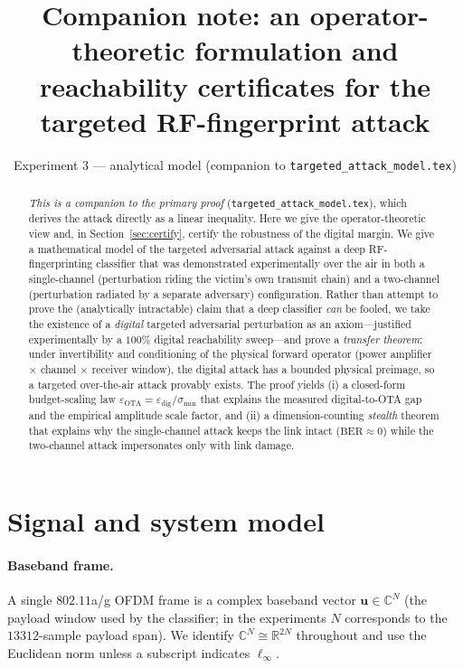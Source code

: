 \documentclass[11pt]{article}
\title{Companion note: an operator-theoretic formulation and \\
       reachability certificates for the targeted RF-fingerprint attack}
\author{Experiment 3 --- analytical model (companion to \texttt{targeted\_attack\_model.tex})}
\date{}
\theoremstyle{definition}
\newcommand{\C}{\mathbb{C}}
\newcommand{\R}{\mathbb{R}}
\newcommand{\bu}{\bm{u}}
\newcommand{\smin}{\sigma_{\min}}
\begin{document}
\maketitle

\begin{abstract}
\emph{This is a companion to the primary proof} (\texttt{targeted\_attack\_model.tex}), which
derives the attack directly as a linear inequality. Here we give the operator-theoretic view and,
in Section~\ref{sec:certify}, certify the robustness of the digital margin.
We give a mathematical model of the targeted adversarial attack against a deep
RF-fingerprinting classifier that was demonstrated experimentally over the air in both a
single-channel (perturbation riding the victim's own transmit chain) and a two-channel
(perturbation radiated by a separate adversary) configuration. Rather than attempt to prove
the (analytically intractable) claim that a deep classifier \emph{can} be fooled, we take the
existence of a \emph{digital} targeted adversarial perturbation as an axiom---justified
experimentally by a $100\%$ digital reachability sweep---and prove a \emph{transfer theorem}:
under invertibility and conditioning of the physical forward operator (power amplifier
$\times$ channel $\times$ receiver window), the digital attack has a bounded physical preimage,
so a targeted over-the-air attack provably exists. The proof yields (i) a closed-form
budget-scaling law $\varepsilon_{\mathrm{OTA}} = \varepsilon_{\mathrm{dig}}/\smin$ that
explains the measured digital-to-OTA gap and the empirical amplitude scale factor, and (ii) a
dimension-counting \emph{stealth} theorem that explains why the single-channel attack keeps the
link intact ($\mathrm{BER}\approx 0$) while the two-channel attack impersonates only with link
damage.
\end{abstract}

\section{Signal and system model}

\paragraph{Baseband frame.} A single $802.11$a/g OFDM frame is a complex baseband vector
$\bu \in \C^{N}$ (the payload window used by the classifier; in the experiments $N$ corresponds
to the $13312$-sample payload span). We identify $\C^{N}\cong\R^{2N}$ throughout and use the
Euclidean norm unless a subscript indicates $\ell_\infty$.
\end{document}
